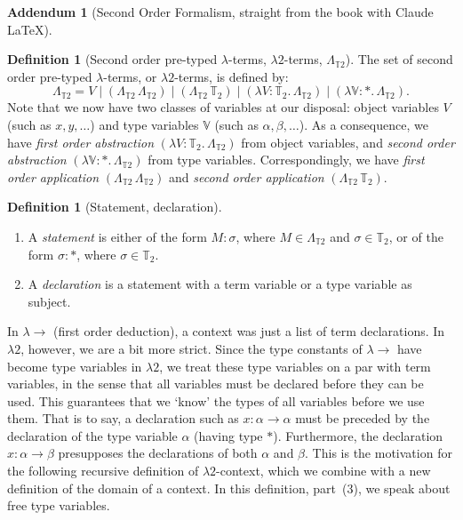\documentclass{article}
\theoremstyle{definition}
\newtheorem{definition} [theorem] {Definition}
\newtheorem{addendum}{Addendum}
\newcommand{\1}{\mathbb{1}}
\newcommand{\0}{\mathbb{0}}
\begin{document}
\begin{addendum}[Second Order Formalism, straight from the book with Claude LaTeX]

\begin{definition}[Second order pre-typed $\lambda$-terms, $\lambda2$-terms, $\Lambda_{\mathbb{T}2}$]
The set of second order pre-typed $\lambda$-terms, or $\lambda2$-terms, is defined by:
\[
  \Lambda_{\mathbb{T}2} = V \mid (\Lambda_{\mathbb{T}2}\, \Lambda_{\mathbb{T}2})
  \mid (\Lambda_{\mathbb{T}2}\, \mathbb{T}_2)
  \mid (\lambda V : \mathbb{T}_2 .\, \Lambda_{\mathbb{T}2})
  \mid (\lambda \mathbb{V} : * .\, \Lambda_{\mathbb{T}2}).
\]
Note that we now have two classes of variables at our disposal: object variables $V$ (such as $x, y, \ldots$) and type variables $\mathbb{V}$ (such as $\alpha, \beta, \ldots$). As a consequence, we have \emph{first order abstraction} $(\lambda V : \mathbb{T}_2 .\, \Lambda_{\mathbb{T}2})$ from object variables, and \emph{second order abstraction} $(\lambda \mathbb{V} : * .\, \Lambda_{\mathbb{T}2})$ from type variables. Correspondingly, we have \emph{first order application} $(\Lambda_{\mathbb{T}2}\, \Lambda_{\mathbb{T}2})$ and \emph{second order application} $(\Lambda_{\mathbb{T}2}\, \mathbb{T}_2)$.
\end{definition}

\begin{definition}[Statement, declaration]\,
\begin{enumerate}
  \item A \emph{statement} is either of the form $M : \sigma$, where
        $M \in \Lambda_{\mathbb{T}2}$ and $\sigma \in \mathbb{T}_2$, or of the
        form $\sigma : *$, where $\sigma \in \mathbb{T}_2$.
  \item A \emph{declaration} is a statement with a term variable or a type
        variable as subject.
\end{enumerate}
\end{definition}

In $\lambda{\to}$ (first order deduction), a context was just a list of term declarations. In $\lambda2$, however, we are a bit more strict. Since the type constants of $\lambda{\to}$ have become type variables in $\lambda2$, we treat these type variables on a par with term variables, in the sense that all variables must be declared before they can be used. This guarantees that we `know' the types of all variables before we use them. That is to say, a declaration such as $x : \alpha \to \alpha$ must be preceded by the declaration of the type variable $\alpha$ (having type $*$). Furthermore, the declaration $x : \alpha \to \beta$ presupposes the declarations of both $\alpha$ and $\beta$. This is the motivation for the following recursive definition of $\lambda2$-context, which we combine with a new definition of the domain of a context. In this definition, part~(3), we speak about free type variables.


\end{addendum}
\end{document}
